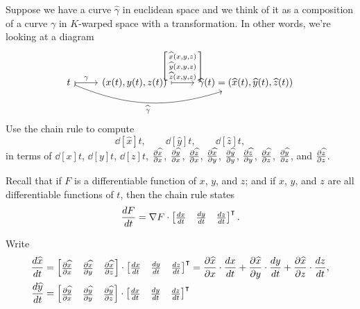 \documentclass[newpage,hints,handout]{ximera}
\begin{document}
\begin{problem}
  Suppose we have a curve $\hat\gamma$ in euclidean space and we think of it as a
  composition of a curve $\gamma$ in $K$-warped space with a transformation.  In
  other words, we're looking at a diagram
  \[
  \begin{tikzcd}
    t \ar[r,mapsto,"\gamma"] \ar[rr,mapsto,bend right=20,swap,"\hat\gamma"] &  (x(t),y(t),z(t))\ar[r,mapsto,"{\left[\begin{smallmatrix}
            \hat x(x,y,z)\\
            \hat y(x,y,z)\\
            \hat z(x,y,z)
          \end{smallmatrix}\right]}"
    ] & \hat\gamma(t)=(\hat x(t),\hat y(t),\hat z(t))
  \end{tikzcd}
  \]
  Use the chain rule to compute
  \[
  \dd[\hat x]{t}, \qquad \dd[\hat y]{t}, \qquad \dd[\hat z]{t},
  \]
  in terms of $\dd[x]{t}$, $\dd[y]{t}$, $\dd[z]{t}$, $\pp[\hat x]{x}$, $\pp[\hat y]{x}$, $\pp[\hat z]{x}$,
  $\pp[\hat x]{y}$, $\pp[\hat y]{y}$, $\pp[\hat z]{y}$, $\pp[\hat x]{z}$, $\pp[\hat y]{z}$, and $\pp[\hat z]{z}$. 
  \begin{hint}
    Recall that if $F$ is a differentiable function of $x$, $y$, and
    $z$; and if $x$, $y$, and $z$ are all differentiable functions of
    $t$, then the chain rule states
    \[
    \dd[F]{t} = \nabla F \cdot
    \begin{bmatrix}
      \dd[x]{t} & \dd[y]{t} & \dd[z]{t}
    \end{bmatrix}^\transpose.
    \]
  \end{hint}
  \begin{freeResponse}
    Write
    \begin{align*}
      \dd[\hat x]{t} &= \begin{bmatrix} \pp[\hat x]{x} & \pp[\hat x]{y} & \pp[\hat x]{z} \end{bmatrix} \cdot \begin{bmatrix} \dd[x]{t} & \dd[y]{t} & \dd[z]{t} \end{bmatrix}^\transpose
      = \pp[\hat x]{x}\cdot\dd[x]{t} + \pp[\hat x]{y}\cdot\dd[y]{t} + \pp[\hat x]{z}\cdot\dd[z]{t}, \\
      \dd[\hat y]{t} &= \begin{bmatrix} \pp[\hat y]{x} & \pp[\hat y]{y} & \pp[\hat y]{z} \end{bmatrix} \cdot \begin{bmatrix} \dd[x]{t} & \dd[y]{t} & \dd[z]{t} \end{bmatrix}^\transpose

\end{align*}
\end{freeResponse}
\end{problem}
\end{document}
